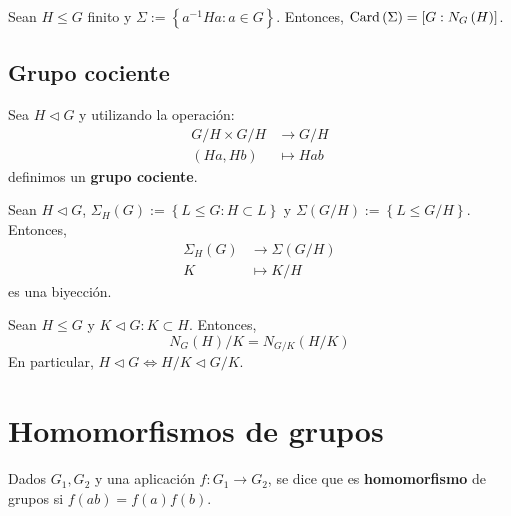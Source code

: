     \begin{prop}
        Sean $H \le G$ finito y $\Sigma := \left\{ a^{-1} H a : a \in G \right\}$. Entonces, $\operatorname{Card} \left( \Sigma \right) = \left[ G : N_G\left( H \right) \right]$.
    \end{prop}

\subsection{Grupo cociente}
    Sea $H \triangleleft G$ y utilizando la operación:
    \begin{align*}
        G / H \times G / H &\rightarrow G / H\\
        \left( Ha, Hb \right) &\mapsto Hab
    \end{align*}
    definimos un \textbf{grupo cociente}.

    \begin{theo}[de Correspondencia]
        Sean $H \triangleleft G$, $\Sigma_{H}\left( G \right) := \left\{ L \le G : H \subset L \right\}$ y $\Sigma\left( G/H \right) := \left\{ L \le G/H \right\}$. Entonces,
        \begin{align*}
            \Sigma_H \left( G \right) &\rightarrow \Sigma\left( G/H \right)\\
            K &\mapsto K/H
        \end{align*}
        es una biyección.
    \end{theo}

    \begin{lema}
        Sean $H \le G$ y $K \triangleleft G : K \subset H$. Entonces,
        \[
            N_G\left( H \right) / K = N_{G/K}\left( H/K \right)
        \]
        En particular, $H \triangleleft G \Leftrightarrow H/K \triangleleft G/K$.
    \end{lema}

\section{Homomorfismos de grupos}
    \begin{defi}
        Dados $G_1, G_2$ y una aplicación $f: G_1 \rightarrow G_2$, se dice que es \textbf{homomorfismo} de grupos si $f\left( ab \right) = f\left( a \right)f\left( b \right)$.
    \end{defi}

